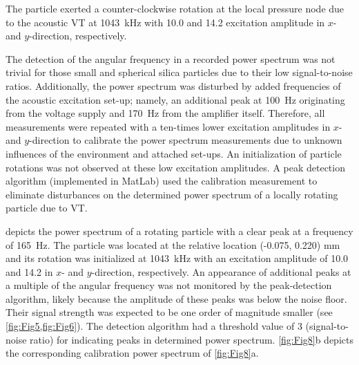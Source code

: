 The particle exerted a counter-clockwise rotation at the local pressure node due 
to the acoustic VT at \SI{1043}{\kilo\hertz} with \SI{10.0}{\Vrms} and 
\SI{14.2}{\Vrms} excitation amplitude in $x$- and $y$-direction, respectively.

The detection of the angular frequency in a recorded power spectrum was not 
trivial for those small and spherical silica particles due to their low 
signal-to-noise ratios. Additionally, the power spectrum was disturbed by added 
frequencies of the acoustic excitation set-up; namely, an additional peak at 
\SI{100}{\hertz} originating from the voltage supply and \SI{170}{\hertz} from 
the amplifier itself.  Therefore, all measurements were repeated with a 
ten-times lower excitation amplitudes in $x$- and $y$-direction to calibrate the 
power spectrum measurements due to unknown influences of the environment and 
attached set-ups. An initialization of particle rotations was not observed at 
these low excitation amplitudes. A peak detection algorithm (implemented in 
MatLab) used the calibration measurement to eliminate disturbances on the 
determined power spectrum of a locally rotating particle due to VT.\@

 depicts the power spectrum of a rotating particle with a clear 
peak at a frequency of \SI{165}{\hertz}. The particle was located at the 
relative location (-0.075, 0.220) \si{\mm} and its rotation was initialized at 
\SI{1043}{\kilo\hertz} with an excitation amplitude of \SI{10.0}{\Vrms} and 
\SI{14.2}{\Vrms} in $x$- and $y$-direction, respectively.  An appearance of 
additional peaks at a multiple of the angular frequency was not monitored by the 
peak-detection algorithm, likely because the amplitude of these peaks was below 
the noise floor. Their signal strength was expected to be one order of magnitude 
smaller (see \cref{fig:Fig5,fig:Fig6}).  The detection algorithm had a threshold 
value of 3 (signal-to-noise ratio) for indicating peaks in determined power 
spectrum.  \cref{fig:Fig8}b depicts the corresponding calibration power spectrum 
of \cref{fig:Fig8}a.

